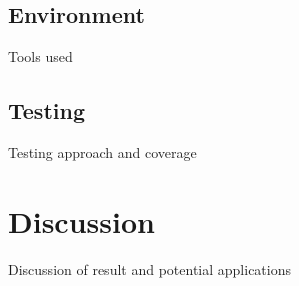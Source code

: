 \documentclass[12pt,a4paper,titlepage,oneside,english]{article}
\begin{document}
\subsection{Environment}
Tools used
\subsection{Testing}
Testing approach and coverage



\section{Discussion}
Discussion of result and potential applications



\newpage
\setcounter{page}{1}
\onehalfspacing
{}



\end{document}
